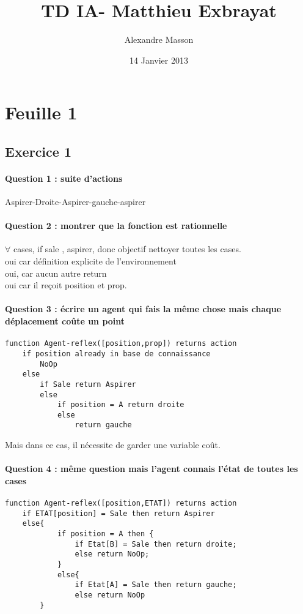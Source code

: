 \documentclass{article}
\title{ TD IA- Matthieu Exbrayat}
\author{Alexandre Masson}
\date{14 Janvier 2013}
\begin{document}
\maketitle
\newpage
\tableofcontents
\newpage
\section{Feuille 1}
\subsection{Exercice 1}
\paragraph{Question 1 : suite d'actions} Aspirer-Droite-Aspirer-gauche-aspirer
\paragraph{Question 2 : montrer que la fonction est rationnelle} $\forall$ cases, if sale , aspirer, donc objectif nettoyer toutes les cases.\\oui car définition explicite de l'environnement\\oui, car aucun autre return\\oui car il reçoit position et prop.
\paragraph{Question 3 : écrire un agent qui fais la même chose mais chaque déplacement coûte un point} 
\begin{verbatim}
function Agent-reflex([position,prop]) returns action
	if position already in base de connaissance
		NoOp
	else
		if Sale return Aspirer
		else
			if position = A return droite
			else
				return gauche
\end{verbatim} 
Mais dans ce cas, il nécessite de garder une variable coût.
\paragraph{Question 4 : même question mais l'agent connais l'état de toutes les cases}
\begin{verbatim}
function Agent-reflex([position,ETAT]) returns action
	if ETAT[position] = Sale then return Aspirer
	else{
			if position = A then {
				if Etat[B] = Sale then return droite;
				else return NoOp;
			}
			else{
				if Etat[A] = Sale then return gauche;
				else return NoOp
		}
\end{verbatim}
\end{document}
